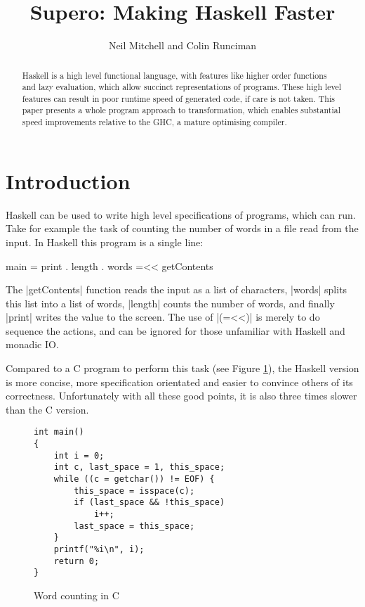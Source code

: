 \documentclass{llncs}
\begin{document}
\title{Supero: Making Haskell Faster}

\author{Neil Mitchell and Colin Runciman}


\maketitle              %

\begin{abstract}
Haskell is a high level functional language, with features like higher order functions and lazy evaluation, which allow succinct representations of programs. These high level features can result in poor runtime speed of generated code, if care is not taken. This paper presents a whole program approach to transformation, which enables substantial speed improvements relative to the GHC, a mature optimising compiler.
\end{abstract}

\section{Introduction}

Haskell can be used to write high level specifications of programs, which can run. Take for example the task of counting the number of words in a file read from the input. In Haskell this program is a single line:

\begin{code}
main = print . length . words =<< getContents
\end{code}

The |getContents| function reads the input as a list of characters, |words| splits this list into a list of words, |length| counts the number of words, and finally |print| writes the value to the screen. The use of |(=<<)| is merely to do sequence the actions, and can be ignored for those unfamiliar with Haskell and monadic IO.

Compared to a C program to perform this task (see Figure \ref{fig:c_words}), the Haskell version is more concise, more specification orientated and easier to convince others of its correctness. Unfortunately with all these good points,  it is also three times slower than the C version.

\begin{figure}[tb]
\begin{verbatim}
int main()
{
	int i = 0;
	int c, last_space = 1, this_space;
	while ((c = getchar()) != EOF) {
		this_space = isspace(c);
		if (last_space && !this_space)
			i++;
		last_space = this_space;
	}
	printf("%i\n", i);
	return 0;
}
\end{verbatim}
\caption{Word counting in C}
\label{fig:c_words}
\end{figure}
\end{document}
